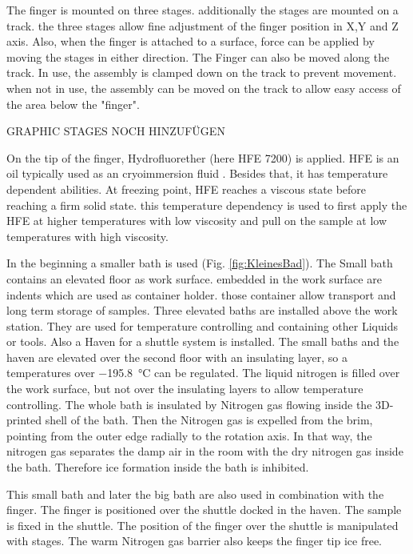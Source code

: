 The finger is  mounted on three stages. additionally the stages are mounted on a track. the three stages allow fine adjustment of the finger position in X,Y and Z axis. Also, when the finger is attached to a surface, force can be applied by moving the stages in either direction. The Finger can also be moved along the track. In use, the assembly is clamped down on the track to prevent movement. when not in use, the assembly can be moved on the track to allow easy access of the area below the "finger".

GRAPHIC STAGES NOCH HINZUFÜGEN

On the tip of the finger, Hydrofluorether (here HFE 7200) is applied. HFE is an oil typically used as an cryoimmersion fluid \cite{Faoro.2018b}. Besides that, it has temperature dependent abilities. At freezing point, HFE reaches a viscous state before reaching a firm solid state. this temperature dependency is used to first apply the HFE at higher temperatures with low viscosity and pull on the sample at low temperatures with high viscosity.

In the beginning a smaller bath is used (Fig. \ref{fig:KleinesBad}). The Small bath contains an elevated floor as work surface. embedded in the work surface are indents which are used as container holder. those container allow transport and long term storage of samples. Three elevated baths are installed above the work station. They are used for temperature controlling and containing other Liquids or tools. Also a Haven for a shuttle system is installed. The small baths and the haven are elevated over the second floor with an insulating layer, so a temperatures over \SI{-195.8}{\degreeCelsius} can be regulated. The liquid nitrogen is filled over the work surface, but not over the insulating layers to allow temperature controlling. The whole bath is insulated by Nitrogen gas flowing inside the 3D-printed shell of the bath. Then the Nitrogen gas is expelled from the brim, pointing from the outer edge radially to the rotation axis. In that way, the nitrogen gas separates the damp air in the room with the dry nitrogen gas inside the bath. Therefore ice formation inside the bath is inhibited.

This small bath and later the big bath are also used in combination with the finger. The finger is positioned over the shuttle docked in the haven. The sample is fixed in the shuttle. The position of the finger over the shuttle is manipulated with stages. The warm Nitrogen gas barrier also keeps the finger tip ice free.

